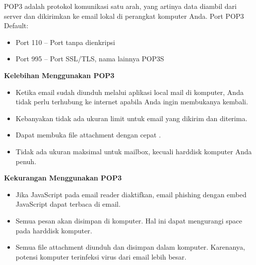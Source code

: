 \documentclass{wileySix}
\begin{document}
\begin{myEnumerate}
	\vspace{12pt}
	POP3 adalah protokol komunikasi satu arah, yang artinya data diambil dari server dan dikirimkan ke email lokal di perangkat komputer Anda. Port POP3 Default: \par
	\noindent 
	\begin{itemize}
		\item Port 110 – Port tanpa dienkripsi \par
		\noindent 
		\item Port 995 – Port SSL/TLS, nama lainnya POP3S\end{itemize}
	\par
	\vspace{12pt}
	\vspace{12pt}
	\vspace{12pt}
	\vspace{12pt}
	\textbf{Kelebihan Menggunakan POP3} \par
	\noindent 
	\begin{itemize}
		\item Ketika email sudah diunduh melalui aplikasi local mail di komputer, Anda tidak perlu terhubung ke internet apabila Anda ingin membukanya kembali. \par
		\noindent 
		\item Kebanyakan tidak ada ukuran limit untuk email yang dikirim dan diterima. \par
		\noindent 
		\item Dapat membuka file attachment dengan cepat . \par
		\noindent 
		\item Tidak ada ukuran maksimal untuk mailbox, kecuali harddisk komputer Anda penuh.\end{itemize}
	\par
	\vspace{12pt}
	\textbf{Kekurangan Menggunakan POP3} \par
	\noindent 
	\begin{itemize}
		\item Jika JavaScript pada email reader diaktifkan, email phishing dengan embed JavaScript dapat terbaca di email. \par
		\noindent 
		\item Semua pesan akan disimpan di komputer. Hal ini dapat mengurangi space pada harddisk komputer. \par
		\noindent 
		\item Semua file attachment diunduh dan disimpan dalam komputer. Karenanya, potensi komputer terinfeksi virus dari email lebih besar. \par

\end{itemize}
\end{myEnumerate}
\end{document}
